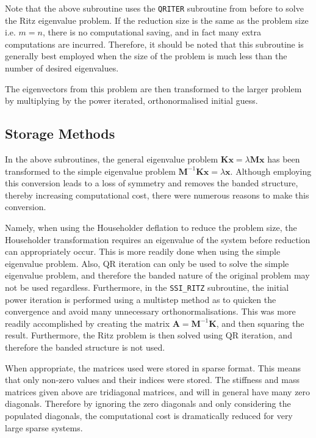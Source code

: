 \documentclass[11pt,oneside]{article}
\begin{document}
Note that the above subroutine uses the \texttt{QRITER} subroutine from before to solve the Ritz eigenvalue problem. If  the reduction size is the same as the problem size i.e. $m=n$, there is no computational saving, and in fact many extra computations are incurred. Therefore, it should be noted that this subroutine is generally best employed when the size of the problem is much less than the number of desired eigenvalues. 

The eigenvectors from this problem are then transformed to the larger problem by multiplying by the power iterated, orthonormalised initial guess.

\subsection*{Storage Methods}

In the above subroutines, the general eigenvalue problem $\mathbf{K} \mathbf{x} =\lambda \textbf{M} \mathbf{x}$ has been transformed to the simple eigenvalue problem $ \textbf{M}^{-1} \mathbf{K} \mathbf{x} =\lambda \mathbf{x}$. Although employing this conversion leads to a loss of symmetry and removes the banded structure, thereby increasing computational cost, there were numerous reasons to make this conversion. 

Namely, when using the Householder deflation to reduce the problem size, the Householder transformation requires an eigenvalue of the system before reduction can appropriately occur. This is more readily done when using the simple eigenvalue problem. Also, QR iteration can only be used to solve the simple eigenvalue problem, and therefore the banded nature of the original problem may not be used regardless. Furthermore, in the \texttt{SSI\_RITZ} subroutine, the initial power iteration is performed using a multistep method as to quicken the convergence and avoid many unnecessary orthonormalisations. This was more readily accomplished by creating the matrix $\mathbf{A} = \textbf{M}^{-1} \mathbf{K}$, and then squaring the result. Furthermore, the Ritz problem is then solved using QR iteration, and therefore the banded structure is not used.

When appropriate, the matrices used were stored in sparse format. This means that only non-zero values and their indices were stored. The stiffness and mass matrices given above are tridiagonal matrices, and will in general have many zero diagonals. Therefore by ignoring the zero diagonals and only considering the populated diagonals, the computational cost is dramatically reduced for very large sparse systems.
\end{document}

